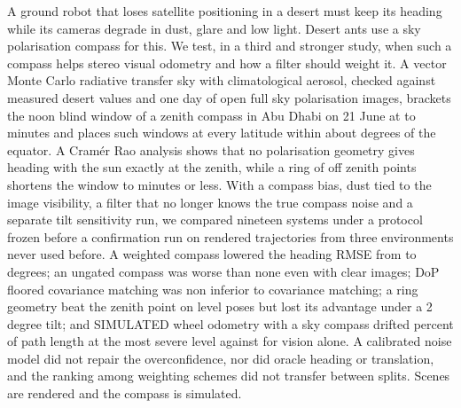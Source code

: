 A ground robot that loses satellite positioning in a desert must keep its heading while its cameras degrade in dust, glare and low light. Desert ants use a sky polarisation compass for this. We test, in a third and stronger study, when such a compass helps stereo visual odometry and how a filter should weight it. A vector Monte Carlo radiative transfer sky with climatological aerosol, checked against measured desert values and one day of open full sky polarisation images, brackets the noon blind window of a zenith compass in Abu Dhabi on 21 June at \sWinAnch{} to \sWinRT{} minutes and places such windows at every latitude within about \sLatMax{} degrees of the equator. A Cram\'er Rao analysis shows that no polarisation geometry gives heading with the sun exactly at the zenith, while a ring of off zenith points shortens the window to minutes or less. With a compass bias, dust tied to the image visibility, a filter that no longer knows the true compass noise and a separate tilt sensitivity run, we compared nineteen systems under a protocol frozen before a confirmation run on \sNconf{} rendered trajectories from three environments never used before. A weighted compass lowered the heading RMSE from \sHoneB{} to \sHoneA{} degrees; an ungated compass was worse than none even with clear images; DoP floored covariance matching was non inferior to covariance matching; a ring geometry beat the zenith point on level poses but lost its advantage under a 2 degree tilt; and SIMULATED wheel odometry with a sky compass drifted \sHfiveA{} percent of path length at the most severe level against \sHfiveB{} for vision alone. A calibrated noise model did not repair the overconfidence, nor did oracle heading or translation, and the ranking among weighting schemes did not transfer between splits. Scenes are rendered and the compass is simulated.
